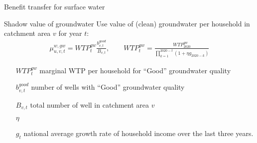\begin{frame}{Benefit transfer for surface water}
\end{frame}

\begin{frame}{Shadow value of groundwater}
  Use value of (clean) groundwater per household in catchment area $v$ for year $t$:
  \begin{align*}
    \mu_{u,v,t}^{w,gw}=WTP_{t}^{gw}\frac{b_{v,t}^{good}}{B_{v,t}},\quad\quad WTP_{t}^{gw}=\frac{WTP_{2020}^{gw}}{\prod_{k=1}^{2020-t}(1+\eta g_{2020-k})}
  \end{align*}
  \begin{itemize}
    \item[{\scriptsize$WTP_{t}^{gw}$}] marginal WTP per household for “Good” groundwater quality
    \item[$b_{v,t}^{good}$] number of wells with “Good” groundwater quality
    \item[$B_{v,t}$] total number of well in catchment area $v$
    \item[$\eta$] 
    \item[$g_{t}$] national average growth rate of household income over the last three years.
  \end{itemize}
\end{frame}